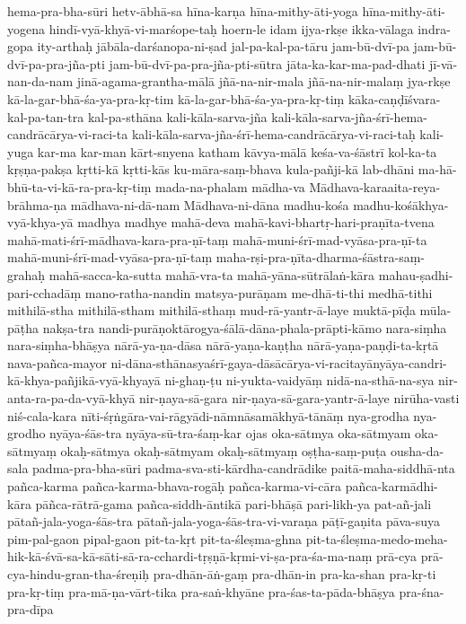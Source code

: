 {{hema-pra-bha-sūri
hetv-ābhā-sa
hīna-karṇa
hīna-mithy-āti-yoga
hīna-mithy-āti-yogena
hindī-vyā-khyā-vi-marśope-taḥ
hoern-le
idam
ijya-rkṣe
ikka-vālaga
indra-gopa
ity-arthaḥ
jābāla-darśanopa-ni-ṣad
jal-pa-kal-pa-tāru
jam-bū-dvī-pa
jam-bū-dvī-pa-pra-jña-pti
jam-bū-dvī-pa-pra-jña-pti-sūtra
jāta-ka-kar-ma-pad-dhati
jī-vā-nan-da-nam
jinā-agama-grantha-mālā
jñā-na-nir-mala
jñā-na-nir-malaṃ
jya-rkṣe
kā-la-gar-bhā-śa-ya-pra-kṛ-tim
kā-la-gar-bhā-śa-ya-pra-kṛ-tiṃ
kāka-caṇḍīśvara-kal-pa-tan-tra
kal-pa-sthāna
kali-kāla-sarva-jña
kali-kāla-sarva-jña-śrī-hema-candrācārya-vi-raci-ta
kali-kāla-sarva-jña-śrī-hema-candrācārya-vi-raci-taḥ
kali-yuga
kar-ma
kar-man
kārt-snyena
katham
kāvya-mālā
keśa-va-śāstrī
kol-ka-ta
kṛṣṇa-pakṣa
kṛtti-kā
kṛtti-kās
ku-māra-saṃ-bhava
kula-pañji-kā
lab-dhāni
ma-hā-bhū-ta-vi-kā-ra-pra-kṛ-tiṃ
mada-na-phalam
mādha-va
Mādhava-karaaita-reya-brāhma-ṇa
mādhava-ni-dā-nam
Mādhava-ni-dāna
madhu-kośa
madhu-kośākhya-vyā-khya-yā
madhya
madhye
mahā-deva
mahā-kavi-bhartṛ-hari-praṇīta-tvena
mahā-mati-śrī-mādhava-kara-pra-ṇī-taṃ
mahā-muni-śrī-mad-vyāsa-pra-ṇī-ta
mahā-muni-śrī-mad-vyāsa-pra-ṇī-taṃ
maha-rṣi-pra-ṇīta-dharma-śāstra-saṃ-grahaḥ
mahā-sacca-ka-sutta
mahā-vra-ta
mahā-yāna-sūtrālaṅ-kāra
mahau-ṣadhi-pari-cchadāṃ
mano-ratha-nandin
matsya-purāṇam
me-dhā-ti-thi
medhā-tithi
mithilā-stha
mithilā-stham
mithilā-sthaṃ
mud-rā-yantr-ā-laye
muktā-pīḍa
mūla-pāṭha
nakṣa-tra
nandi-purāṇoktārogya-śālā-dāna-phala-prāpti-kāmo
nara-siṃha
nara-siṃha-bhāṣya
nārā-ya-ṇa-dāsa
nārā-yaṇa-kaṇṭha
nārā-yaṇa-paṇḍi-ta-kṛtā
nava-pañca-mayor
ni-dāna-sthānasyaśrī-gaya-dāsācārya-vi-racitayānyāya-candri-kā-khya-pañjikā-vyā-khyayā
ni-ghaṇ-ṭu
ni-yukta-vaidyāṃ
nidā-na-sthā-na-sya
nir-anta-ra-pa-da-vyā-khyā
nir-ṇaya-sā-gara
nir-ṇaya-sā-gara-yantr-ā-laye
nirūha-vasti
niś-cala-kara
nīti-śṛṅgāra-vai-rāgyādi-nāmnāsamākhyā-tānāṃ
nya-grodha
nya-grodho
nyāya-śās-tra
nyāya-sū-tra-śaṃ-kar
ojas
oka-sātmya
oka-sātmyam
oka-sātmyaṃ
okaḥ-sātmya
okaḥ-sātmyam
okaḥ-sātmyaṃ
oṣṭha-saṃ-puṭa
ousha-da-sala
padma-pra-bha-sūri
padma-sva-sti-kārdha-candrādike
paitā-maha-siddhā-nta
pañca-karma
pañca-karma-bhava-rogāḥ
pañca-karma-vi-cāra
pañca-karmādhi-kāra
pāñca-rātrā-gama
pañca-siddh-āntikā
pari-bhāṣā
pari-likh-ya
pat-añ-jali
pātañ-jala-yoga-śās-tra
pātañ-jala-yoga-śās-tra-vi-varaṇa
pāṭī-gaṇita
pāva-suya
pim-pal-gaon
pipal-gaon
pit-ta-kṛt
pit-ta-śleṣma-ghna
pit-ta-śleṣma-medo-meha-hik-kā-śvā-sa-kā-sāti-sā-ra-cchardi-tṛṣṇā-kṛmi-vi-ṣa-pra-śa-ma-naṃ
prā-cya
prā-cya-hindu-gran-tha-śreṇiḥ
pra-dhān-āṅ-gaṃ
pra-dhān-in
pra-ka-shan
pra-kṛ-ti
pra-kṛ-tiṃ
pra-mā-ṇa-vārt-tika
pra-saṅ-khyāne
pra-śas-ta-pāda-bhāṣya
pra-śna-pra-dīpa
}}
